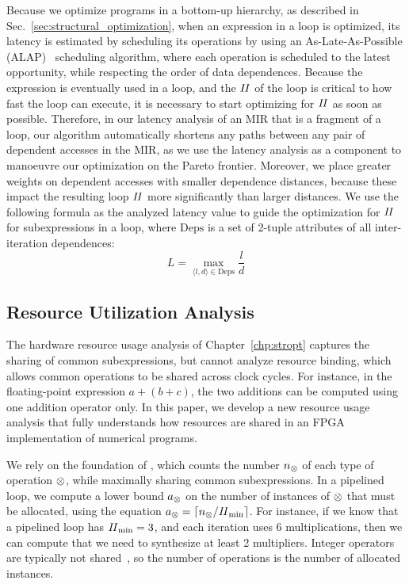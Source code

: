 Because we optimize programs in a bottom-up hierarchy, as described in
Sec.~\ref{sec:structural_optimization}, when an expression in a loop is
optimized, its latency is estimated by scheduling its operations by using an
As-Late-As-Possible (ALAP)~\cite{wang_hls} scheduling algorithm, where each
operation is scheduled to the latest opportunity, while respecting the order of
data dependences.  Because the expression is eventually used in a loop, and the
$\mathit{II}$ of the loop is critical to how fast the loop can execute, it is necessary
to start optimizing for $\mathit{II}$ as soon as possible. Therefore, in our latency
analysis of an MIR that is a fragment of a loop, our algorithm automatically
shortens any paths between any pair of dependent accesses in the MIR\@, as we
use the latency analysis as a component to manoeuvre our optimization on the
Pareto frontier.  Moreover, we place greater weights on dependent accesses with
smaller dependence distances, because these impact the resulting loop $\mathit{II}$
more significantly than larger distances.  We use the following formula as the
analyzed latency value to guide the optimization for $\mathit{II}$ for subexpressions
in a loop, where $\mathrm{Deps}$ is a set of 2-tuple attributes of all
inter-iteration dependences:
\begin{equation}
    L = \max_{\langle l, d \rangle \in \mathrm{Deps}} \frac{l}{d}
\end{equation}

\subsection{Resource Utilization Analysis}
\label{sub:resource_utilization_analysis}

The hardware resource usage analysis of Chapter~\ref{chp:stropt} captures the
sharing of common subexpressions, but cannot analyze resource binding, which
allows common operations to be shared across clock cycles. For instance, in
the floating-point expression $a + (b + c)$, the two additions can be computed
using one addition operator only. In this paper, we develop a new resource
usage analysis that fully understands how resources are shared in an FPGA
implementation of numerical programs.

We rely on the foundation of \SOAP{}, which counts the number $n_\otimes$
of each type of operation $\otimes$, while maximally sharing common
subexpressions.  In a pipelined loop, we compute a lower bound $a_\otimes$
on the number of instances of $\otimes$ that must be allocated, using
the equation $a_\otimes = \lceil n_\otimes/\mathit{II}_{\rm min}\rceil$.  For instance,
if we know that a pipelined loop has $\mathit{II}_{\rm min} = 3$, and each iteration uses 6
multiplications, then we can compute that we need to synthesize at least 2
multipliers.  Integer operators are typically not shared~\cite{cong15}, so the
number of operations is the number of allocated instances.


